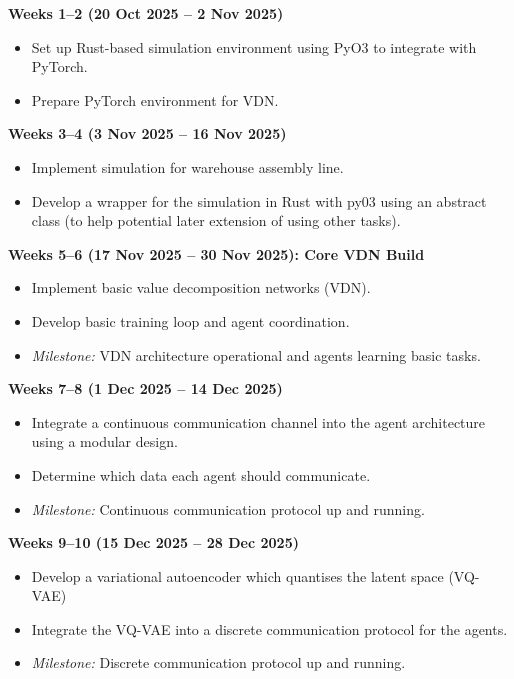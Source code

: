 \begin{list}{}{\leftmargin=0cm \itemindent=0cm}

\item \textbf{Weeks 1--2 (20 Oct 2025 -- 2 Nov 2025)}
\begin{itemize}
\item Set up Rust-based simulation environment using PyO3 to integrate with PyTorch.
\item Prepare PyTorch environment for VDN.
\end{itemize}

\item \textbf{Weeks 3--4 (3 Nov 2025 -- 16 Nov 2025)}
\begin{itemize}
\item Implement simulation for warehouse assembly line.
\item Develop a wrapper for the simulation in Rust with py03 using an abstract class (to help potential later extension of using other tasks).
\end{itemize}

\item \textbf{Weeks 5--6 (17 Nov 2025 -- 30 Nov 2025): Core VDN Build}
\begin{itemize}
\item Implement basic value decomposition networks (VDN).
\item Develop basic training loop and agent coordination.
\item \textit{Milestone:} VDN architecture operational and agents learning basic tasks.
\end{itemize}

\item \textbf{Weeks 7--8 (1 Dec 2025 -- 14 Dec 2025)}
\begin{itemize}
\item Integrate a continuous communication channel into the agent architecture using a modular design.
\item Determine which data each agent should communicate.
\item \textit{Milestone:} Continuous communication protocol up and running.
\end{itemize}

\item \textbf{Weeks 9--10 (15 Dec 2025 -- 28 Dec 2025)}
\begin{itemize}
\item Develop a variational autoencoder which quantises the latent space (VQ-VAE)
\item Integrate the VQ-VAE into a discrete communication protocol for the agents.
\item \textit{Milestone:} Discrete communication protocol up and running.
\end{itemize}


\end{list}
